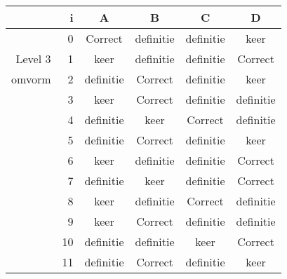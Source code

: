 \begin{tabular}{ rr| c|c|c|c}\hline\hline
     & i & \textbf{A} & \textbf{B} & \textbf{C} & \textbf{D}\\\hline

&0&Correct\cellcolor[gray]{0.6}&definitie&definitie&keer\\
Level 3 & 1&keer&definitie&definitie&Correct\cellcolor[gray]{0.6}\\
omvorm &2&definitie&Correct\cellcolor[gray]{0.6}&definitie&keer\\
&3&keer&Correct\cellcolor[gray]{0.6}&definitie&definitie\\
&4&definitie&keer&Correct\cellcolor[gray]{0.6}&definitie\\
&5&definitie&Correct\cellcolor[gray]{0.6}&definitie&keer\\
&6&keer&definitie&definitie&Correct\cellcolor[gray]{0.6}\\
&7&definitie&keer&definitie&Correct\cellcolor[gray]{0.6}\\
&8&keer&definitie&Correct\cellcolor[gray]{0.6}&definitie\\
&9&keer&Correct\cellcolor[gray]{0.6}&definitie&definitie\\
&10&definitie&definitie&keer&Correct\cellcolor[gray]{0.6}\\
&11&definitie&Correct\cellcolor[gray]{0.6}&definitie&keer\\
\hline\end{tabular}\par\ \newline

